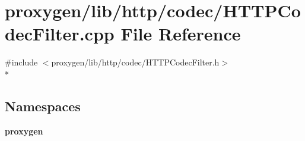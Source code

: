 \section{proxygen/lib/http/codec/\+H\+T\+T\+P\+Codec\+Filter.cpp File Reference}
\label{HTTPCodecFilter_8cpp}
{\ttfamily \#include $<$proxygen/lib/http/codec/\+H\+T\+T\+P\+Codec\+Filter.\+h$>$}\\*
\subsection*{Namespaces}
\begin{DoxyCompactItemize}
\item 
 {\bf proxygen}
\end{DoxyCompactItemize}
